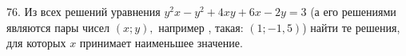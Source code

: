 76. Из всех решений уравнения $y^2x-y^2+4xy+6x-2y=3$ (а его решениями являются пары чисел $(x;y),$ например , такая: $(1;-1,5)$) найти те решения, для которых $x$ принимает наименьшее значение.\\
